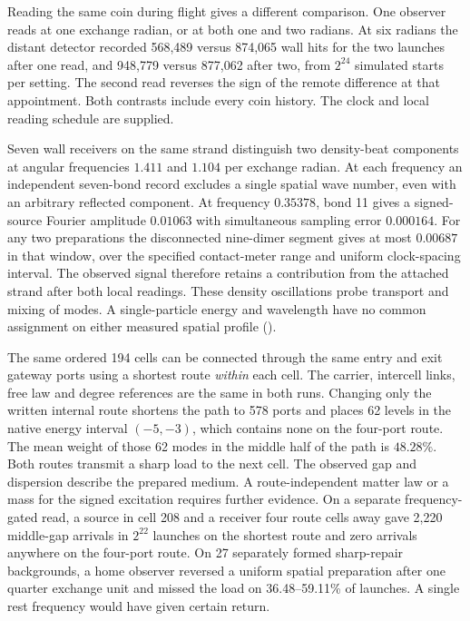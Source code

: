 \documentclass[11pt]{article}
\theoremstyle{definition}
\theoremstyle{remark}
\theoremstyle{plain}
\begin{document}
Reading the same coin during flight gives a different comparison.
One observer reads at one exchange radian, or at both one and two
radians. At six radians the distant detector recorded 568,489 versus
874,065 wall hits for the two launches after one read, and 948,779
versus 877,062 after two, from $2^{24}$ simulated starts per setting.
The second read reverses the sign of the remote difference at that
appointment. Both contrasts include every coin history. The clock
and local reading schedule are supplied.

Seven wall receivers on the same strand distinguish two density-beat
components at angular frequencies $1.411$ and $1.104$ per exchange
radian. At each frequency an independent seven-bond record excludes
a single spatial wave number, even with an arbitrary reflected
component. At frequency $0.35378$, bond 11 gives a signed-source
Fourier amplitude $0.01063$ with simultaneous sampling error
$0.000164$. For any two preparations the disconnected nine-dimer
segment gives at most $0.00687$ in that window, over the specified
contact-meter range and uniform clock-spacing interval. The observed
signal therefore retains a contribution from the attached strand
after both local readings. These density oscillations probe transport
and mixing of modes. A single-particle energy and wavelength have no
common assignment on either measured spatial profile
().

The same ordered 194 cells can be connected through the same entry and
exit gateway ports using a shortest route \emph{within} each cell.
The carrier, intercell links, free law and degree references are the
same in both runs. Changing only the written internal route shortens
the path to 578 ports and places 62 levels in the native energy interval
$(-5,-3)$, which contains none on the four-port route. The mean weight
of those 62 modes in the middle half of the path is $48.28\%$.
Both routes transmit a sharp load to the next cell. The observed gap
and dispersion describe the prepared medium. A route-independent
matter law or a mass for the signed excitation requires further evidence.
On a separate frequency-gated read, a source in cell 208 and a
receiver four route cells away gave 2,220 middle-gap arrivals in
$2^{22}$ launches on the shortest route and zero arrivals anywhere on
the four-port route. On 27 separately formed sharp-repair backgrounds,
a home observer reversed a uniform spatial preparation after one
quarter exchange unit and missed the load on 36.48--59.11\% of
launches. A single rest frequency would have given certain return.
\end{document}
